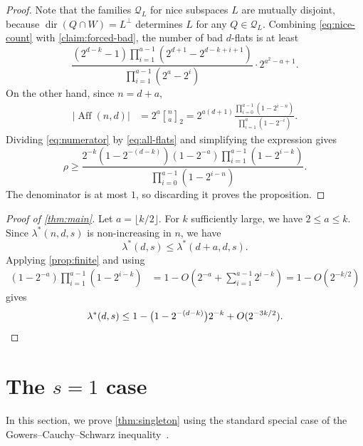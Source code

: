 \documentclass[10pt,a4paper]{amsart}
\newcommand{\cQ}{\mathcal Q}
\newcommand{\qbinom}[2]{\genfrac{[}{]}{0pt}{}{#1}{#2}_{\!2}}
\DeclareMathOperator{\Aff}{Aff}
\DeclareMathOperator{\dir}{dir}
\begin{document}
\begin{proof}
Note that the families $\cQ_L$ for nice subspaces $L$ are
mutually disjoint, because $\dir(Q\cap W)=L^\perp$ determines $L$ for any $Q\in\cQ_L$.
Combining \eqref{eq:nice-count} with \cref{claim:forced-bad}, the
number of bad $d$-flats is at least
\begin{equation}\label{eq:numerator}
      \frac{(2^{d-k}-1)
    \prod_{i=1}^{a-1}(2^{d+1}-2^{d-k+i+1})}
  {\prod_{i=1}^{a-1}(2^a-2^i)}
  \cdot2^{a^2-a+1}.
\end{equation}
On the other hand, since $n=d+a$,
\begin{equation}\label{eq:all-flats}
\begin{split}
  |\Aff(n,d)|
  &=2^a\qbinom{n}{a}=2^{a(d+1)}
    \frac{\prod_{i=0}^{a-1}(1-2^{i-n})}
         {\prod_{i=1}^{a}(1-2^{-i})}.
\end{split}
\end{equation}
Dividing \eqref{eq:numerator} by \eqref{eq:all-flats} and simplifying the expression gives
\[
  \rho\ge
  \frac{2^{-k}(1-2^{-(d-k)})(1-2^{-a})
  \prod_{i=1}^{a-1}(1-2^{i-k})}
  {\prod_{i=0}^{a-1}(1-2^{i-n})}.
\]
The denominator is at most $1$, so discarding it proves the proposition.
\end{proof}


\begin{proof}[Proof of \cref{thm:main}]
Let $a=\lfloor k/2\rfloor$.  For $k$ sufficiently large, we have
$2\le a\le k$.  Since $\lambda^*(n,d,s)$ is non-increasing in $n$, we have
\[
  \lambda^*(d,s)\le\lambda^*(d+a,d,s).
\]
Applying \cref{prop:finite} and using
\[
\begin{split}
  (1-2^{-a})\prod_{i=1}^{a-1}(1-2^{i-k})
  &=1-O\left(2^{-a}+\sum_{i=1}^{a-1}2^{i-k}\right)=1-O(2^{-k/2})
\end{split}
\]
gives
\[
  \lambda^*(d,s)
  \le1-\bigl(1-2^{-(d-k)}\bigr)2^{-k}
  +O(2^{-3k/2}).\qedhere
\]
\end{proof}


\section{The $s=1$ case}\label{sec:singleton-proof}
In this section, we prove \cref{thm:singleton} using the standard special case of the
Gowers--Cauchy--Schwarz inequality~\cite{Gowers2001}.
\end{document}
